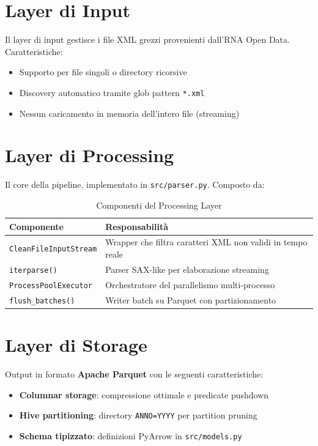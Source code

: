 \section{Layer di Input}

Il layer di input gestisce i file XML grezzi provenienti dall'RNA Open Data. Caratteristiche:

\begin{itemize}
    \item Supporto per file singoli o directory ricorsive
    \item Discovery automatico tramite glob pattern \texttt{*.xml}
    \item Nessun caricamento in memoria dell'intero file (streaming)
\end{itemize}

\section{Layer di Processing}

Il core della pipeline, implementato in \texttt{src/parser.py}. Composto da:

\begin{table}[h]
\centering
\begin{tabular}{@{}lp{8cm}@{}}
\toprule
\textbf{Componente} & \textbf{Responsabilità} \\
\midrule
\texttt{CleanFileInputStream} & Wrapper che filtra caratteri XML non validi in tempo reale \\
\texttt{iterparse()} & Parser SAX-like per elaborazione streaming \\
\texttt{ProcessPoolExecutor} & Orchestratore del parallelismo multi-processo \\
\texttt{flush\_batches()} & Writer batch su Parquet con partizionamento \\
\bottomrule
\end{tabular}
\caption{Componenti del Processing Layer}
\end{table}

\section{Layer di Storage}

Output in formato \textbf{Apache Parquet} con le seguenti caratteristiche:

\begin{itemize}
    \item \textbf{Columnar storage}: compressione ottimale e predicate pushdown
    \item \textbf{Hive partitioning}: directory \texttt{ANNO=YYYY} per partition pruning
    \item \textbf{Schema tipizzato}: definizioni PyArrow in \texttt{src/models.py}
\end{itemize}

